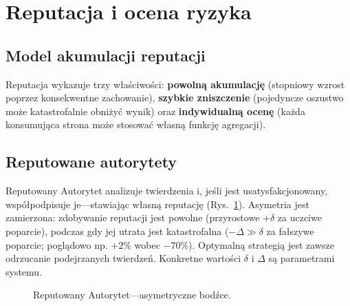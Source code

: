 \documentclass[11pt,a4paper,twocolumn]{article}
\begin{document}
\section{Reputacja i ocena ryzyka}

\subsection{Model akumulacji reputacji}

Reputacja wykazuje trzy właściwości: \textbf{powolną akumulację} (stopniowy wzrost poprzez konsekwentne zachowanie), \textbf{szybkie zniszczenie} (pojedyncze oszustwo może katastrofalnie obniżyć wynik) oraz \textbf{indywidualną ocenę} (każda konsumująca strona może stosować własną funkcję agregacji).

\subsection{Reputowane autorytety}

Reputowany Autorytet analizuje twierdzenia i, jeśli jest usatysfakcjonowany, współpodpisuje je---stawiając własną reputację (Rys.~\ref{fig:authority}). Asymetria jest zamierzona: zdobywanie reputacji jest powolne (przyrostowe $+\delta$ za uczciwe poparcie), podczas gdy jej utrata jest katastrofalna ($-\Delta \gg \delta$ za fałszywe poparcie; poglądowo np. $+2\%$ wobec $-70\%$). Optymalną strategią jest zawsze odrzucanie podejrzanych twierdzeń. Konkretne wartości $\delta$ i $\Delta$ są parametrami systemu.

\begin{figure}[ht]
\centering
{}
\caption{Reputowany Autorytet---asymetryczne bodźce.}
\label{fig:authority}
\end{figure}
\end{document}
